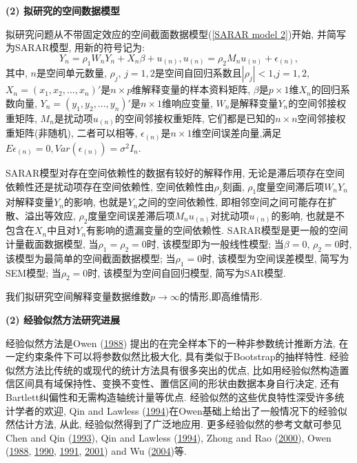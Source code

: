 \documentclass[cs4size]{article}
\def\be{\begin{equation}}
\def\ee{\end{equation}}
\def\nn{\nonumber}
\def\link{\hyperlink}
\begin{document}
{\bf (2) 拟研究的空间数据模型}

拟研究问题从{\kaishu 不带固定效应的空间截面数据模型}(\ref{SARAR model 2})开始, 并简写为SARAR模型, 用新的符号记为: 
\be
    Y_{n} =\rho_1W_nY_n+X_n\beta+u_{(n)}, u_{(n)}=\rho_2M_nu_{(n)}+\epsilon_{(n)} ,\label{model}
\nn
\ee
其中, $n$是空间单元数量, $\rho_j$, $j=1,2$是空间自回归系数且$|\rho_j|<1$,$j=1,2$, $X_n=(x_1,x_2,...,x_n )'$是$n \times p$维解释变量的样本资料矩阵, $\beta$是$p\times 1$维$X_n$的回归系数向量, $Y_n=(y_1,y_2,...,y_n )'$是$n \times 1$维响应变量, $W_n$是解释变量$Y_n$的空间邻接权重矩阵, $M_n$是扰动项$u_{(n)}$的空间邻接权重矩阵, 它们都是已知的$n \times n$空间邻接权重矩阵(非随机), 二者可以相等, $\epsilon_{(n)}$是$n \times 1$维空间误差向量,满足$E\epsilon_{(n)}=0,Var(\epsilon_{(n)})=\sigma^2 I_n$.

SARAR模型对存在空间依赖性的数据有较好的解释作用, 无论是滞后项存在空间依赖性还是扰动项存在空间依赖性, 空间依赖性由$\rho_j$刻画, $\rho_1$度量空间滞后项$W_nY_n$对解释变量$Y_n$的影响, 也就是$Y_n$之间的空间依赖性, 即相邻空间之间可能存在扩散、溢出等效应, $\rho_2$度量空间误差滞后项$M_nu_{(n)}$对扰动项$u_{(n)}$的影响, 也就是不包含在$X_n$中且对$Y_n$有影响的遗漏变量的空间依赖性.
SARAR模型是更一般的空间计量截面数据模型, 当$\rho_1=\rho_2=0$时, 该模型即为一般线性模型; 当$\beta=0$, $\rho_2=0$时, 该模型为最简单的空间截面数据模型; 当$\rho_1=0$时, 该模型为空间误差模型, 简写为SEM模型; 当$\rho_2=0$时, 该模型为空间自回归模型, 简写为SAR模型.

我们拟研究空间解释变量数据维数$p \to \infty$的情形,即高维情形.

{\bf (2) 经验似然方法研究进展}

经验似然方法是Owen (\link{Owen 1988}{1988}) 提出的在完全样本下的一种非参数统计推断方法, 在一定约束条件下可以将参数似然比极大化, 具有类似于Bootstrap的抽样特性. 经验似然方法比传统的或现代的统计方法具有很多突出的优点, 比如用经验似然构造置信区间具有域保持性、变换不变性、置信区间的形状由数据本身自行决定, 还有Bartlett纠偏性和无需构造轴统计量等优点. 经验似然的这些优良特性深受许多统计学者的欢迎, Qin and Lawless (\link{Qin and Lawless 1994}{1994})在Owen基础上给出了一般情况下的经验似然估计方法, 从此, 经验似然得到了广泛地应用. 更多经验似然的参考文献可参见Chen and Qin (\link{Chen and Qin 1993}{1993}), Qin and Lawless (\link{Qin and Lawless 1994}{1994}), Zhong and Rao (\link{Zhong and Rao 2000}{2000}), Owen (\link{Owen 1988}{1988}, \link{Owen 1990}{1990}, \link{Owen 1991}{1991}, \link{Owen 2001}{2001}) and Wu (\link{Wu 2004}{2004})等. 
\end{document}
